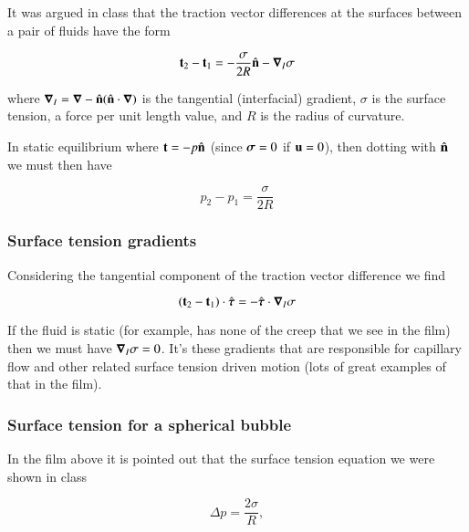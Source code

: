 It was argued in class that the traction vector differences at the surfaces between a pair of fluids have the form

\begin{equation}\label{eqn:continuumFluidsReview:2090}
\mathbf{t}_2 - \mathbf{t}_1 = -\frac{\sigma}{2 R} \hat{\mathbf{n}} - \boldsymbol{\nabla}_I \sigma
\end{equation}

where $\boldsymbol{\nabla}_I = \boldsymbol{\nabla} - \hat{\mathbf{n}} (\hat{\mathbf{n}} \cdot \boldsymbol{\nabla})$ is the tangential (interfacial) gradient, $\sigma$ is the surface tension, a force per unit length value, and $R$ is the radius of curvature.

In static equilibrium where $\mathbf{t} = -p \hat{\mathbf{n}}$ (since $\boldsymbol{\sigma} = 0$ if $\mathbf{u} = 0$), then dotting with $\hat{\mathbf{n}}$ we must then have

\begin{equation}\label{eqn:continuumFluidsReview:2110}
p_2 - p_1 = \frac{\sigma}{2 R} 
\end{equation}

\subsubsection{Surface tension gradients}

Considering the tangential component of the traction vector difference we find

\begin{equation}\label{eqn:continuumFluidsReview:2130}
(\mathbf{t}_2 - \mathbf{t}_1) \cdot \hat{\boldsymbol{\tau}} = - \hat{\boldsymbol{\tau}} \cdot \boldsymbol{\nabla}_I \sigma
\end{equation}

If the fluid is static (for example, has none of the creep that we see in the film) then we must have $\boldsymbol{\nabla}_I \sigma = 0$.  It's these gradients that are responsible for capillary flow and other related surface tension driven motion (lots of great examples of that in the film).

\subsubsection{Surface tension for a spherical bubble}

In the film above it is pointed out that the surface tension equation we were shown in class

\begin{equation}\label{eqn:continuumFluidsReview:1490}
\Delta p = \frac{2 \sigma}{R},
\end{equation}

